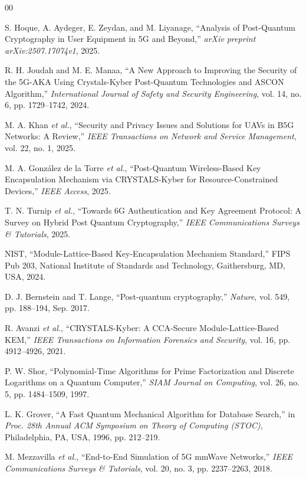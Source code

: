\documentclass{ieeeaccess}
\begin{document}
\begin{thebibliography}{00}

S. Hoque, A. Aydeger, E. Zeydan, and M. Liyanage, ``Analysis of Post-Quantum Cryptography in User Equipment in 5G and Beyond,'' \textit{arXiv preprint arXiv:2507.17074v1}, 2025.

R. H. Joudah and M. E. Manaa, ``A New Approach to Improving the Security of the 5G-AKA Using Crystals-Kyber Post-Quantum Technologies and ASCON Algorithm,'' \textit{International Journal of Safety and Security Engineering}, vol. 14, no. 6, pp. 1729--1742, 2024.

M. A. Khan \textit{et al.}, ``Security and Privacy Issues and Solutions for UAVs in B5G Networks: A Review,'' \textit{IEEE Transactions on Network and Service Management}, vol. 22, no. 1, 2025.

M. A. Gonz\'{a}lez de la Torre \textit{et al.}, ``Post-Quantum Wireless-Based Key Encapsulation Mechanism via CRYSTALS-Kyber for Resource-Constrained Devices,'' \textit{IEEE Access}, 2025.

T. N. Turnip \textit{et al.}, ``Towards 6G Authentication and Key Agreement Protocol: A Survey on Hybrid Post Quantum Cryptography,'' \textit{IEEE Communications Surveys \& Tutorials}, 2025.

NIST, ``Module-Lattice-Based Key-Encapsulation Mechanism Standard,'' FIPS Pub 203, National Institute of Standards and Technology, Gaithersburg, MD, USA, 2024.

D. J. Bernstein and T. Lange, ``Post-quantum cryptography,'' \textit{Nature}, vol. 549, pp. 188--194, Sep. 2017.

R. Avanzi \textit{et al.}, ``CRYSTALS-Kyber: A CCA-Secure Module-Lattice-Based KEM,'' \textit{IEEE Transactions on Information Forensics and Security}, vol. 16, pp. 4912--4926, 2021.

P. W. Shor, ``Polynomial-Time Algorithms for Prime Factorization and Discrete Logarithms on a Quantum Computer,'' \textit{SIAM Journal on Computing}, vol. 26, no. 5, pp. 1484--1509, 1997.

L. K. Grover, ``A Fast Quantum Mechanical Algorithm for Database Search,'' in \textit{Proc. 28th Annual ACM Symposium on Theory of Computing (STOC)}, Philadelphia, PA, USA, 1996, pp. 212--219.

M. Mezzavilla \textit{et al.}, ``End-to-End Simulation of 5G mmWave Networks,'' \textit{IEEE Communications Surveys \& Tutorials}, vol. 20, no. 3, pp. 2237--2263, 2018.


\end{thebibliography}
\end{document}
